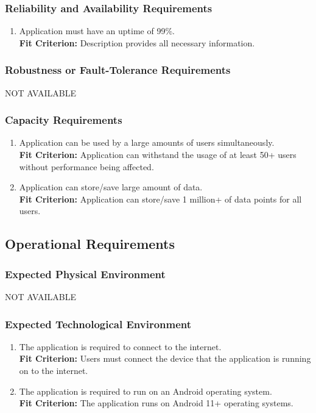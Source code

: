 \documentclass[12pt,letterpaper]{article}
\begin{document}
\subsubsection{Reliability and Availability Requirements}
\begin{enumerate}[resume*] 
\item Application must have an uptime of 99\%.\\
{\textbf{Fit Criterion:} Description provides all necessary information. }
\end{enumerate}

\subsubsection{Robustness or Fault-Tolerance Requirements}
\noindent NOT AVAILABLE

\subsubsection{Capacity Requirements}
\begin{enumerate}[resume*] 
\item Application can be used by a large amounts of users simultaneously.\\
{\textbf{Fit Criterion:} Application can withstand the usage of at least 50+ users without performance being affected. }
\item Application can store/save large amount of data.\\
{\textbf{Fit Criterion:} Application can store/save 1 million+ of data points for all users. }
\end{enumerate}

\subsection{Operational Requirements}
\subsubsection{Expected Physical Environment}
NOT AVAILABLE
\subsubsection{Expected Technological Environment}
\begin{enumerate}[{OE}1.] 
    \item The application is required to connect to the internet.\\
    {\textbf{Fit Criterion:} Users must connect the device that the application is running on to the internet.}
    \item The application is required to run on an Android operating system.\\
    {\textbf{Fit Criterion:} The application runs on Android 11+ operating systems.}
\end{enumerate}
\end{document}

